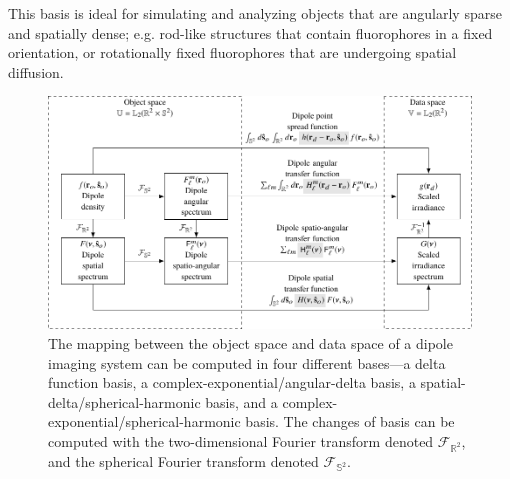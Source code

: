 \documentclass[]{osa-article}
\providecommand{\mbb}[1]{\mathbb{#1}}
\begin{document}
  This basis is ideal for simulating and analyzing objects that are angularly
  sparse and spatially dense; e.g. rod-like structures that contain fluorophores
  in a fixed orientation, or rotationally fixed fluorophores that are undergoing
  spatial diffusion.

  \begin{figure}
  \hspace{-5em}
  \includegraphics[scale=1.0]{../figures/dipole-block/dipole-block.pdf}
  \caption{The mapping between the object space and data space of a dipole
    imaging system can be computed in four different bases---a delta function
    basis, a complex-exponential/angular-delta basis, a
    spatial-delta/spherical-harmonic basis, and a
    complex-exponential/spherical-harmonic basis. The changes of basis can be
    computed with the two-dimensional Fourier transform denoted
    $\mathcal{F}_{\mbb{R}^2}$, and the spherical Fourier transform denoted
    $\mathcal{F}_{\mbb{S}^2}$.}
   \label{fig:dipole-block}      
    \end{figure}
\end{document}
